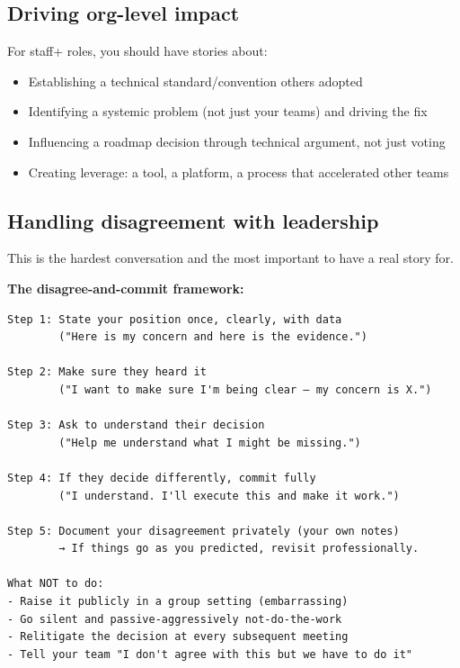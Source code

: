 \documentclass[11pt]{article}
\providecommand{\tightlist}{\setlength{\itemsep}{1pt}\setlength{\parskip}{0pt}}
\begin{document}
\subsection{Driving org-level impact}\label{driving-org-level-impact}

For staff+ roles, you should have stories about:

\begin{itemize}
\tightlist
\item
  Establishing a technical standard/convention others adopted
\item
  Identifying a systemic problem (not just your team\textquotesingle s) and driving the fix
\item
  Influencing a roadmap decision through technical argument, not just voting
\item
  Creating leverage: a tool, a platform, a process that accelerated other teams
\end{itemize}

\subsection{Handling disagreement with leadership}\label{handling-disagreement-with-leadership}

This is the hardest conversation and the most important to have a real story for.

\textbf{The disagree-and-commit framework:}

\setcodelang{}

\begin{verbatim}
Step 1: State your position once, clearly, with data
        ("Here is my concern and here is the evidence.")

Step 2: Make sure they heard it
        ("I want to make sure I'm being clear — my concern is X.")

Step 3: Ask to understand their decision
        ("Help me understand what I might be missing.")

Step 4: If they decide differently, commit fully
        ("I understand. I'll execute this and make it work.")

Step 5: Document your disagreement privately (your own notes)
        → If things go as you predicted, revisit professionally.

What NOT to do:
- Raise it publicly in a group setting (embarrassing)
- Go silent and passive-aggressively not-do-the-work
- Relitigate the decision at every subsequent meeting
- Tell your team "I don't agree with this but we have to do it"
\end{verbatim}
\end{document}
